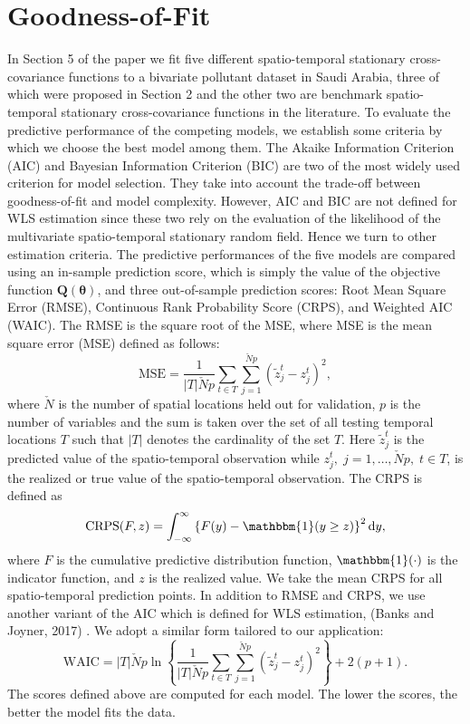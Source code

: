 \documentclass[12pt]{article}
\newcommand{\0}{\mathbf{0}}
\begin{document}
\section{Goodness-of-Fit}
In Section 5 of the paper we fit five different spatio-temporal stationary cross-covariance functions to a bivariate pollutant dataset in Saudi Arabia, three of which were proposed in Section 2 and the other two are benchmark spatio-temporal stationary cross-covariance functions in the literature. To evaluate the predictive performance of the competing models, we establish some criteria by which we choose the best model among them. The Akaike Information Criterion (AIC) and Bayesian Information Criterion (BIC) are two of the most widely used criterion for model selection. They take into account the trade-off between goodness-of-fit and model complexity. However, AIC and BIC are not defined for WLS estimation since these two rely on the evaluation of the likelihood of the multivariate spatio-temporal stationary random field. Hence we turn to other estimation criteria. The predictive performances of the five models are compared using an in-sample prediction score, which is simply the value of the objective function $\mathbf{Q}(\boldsymbol{\theta})$, and three out-of-sample prediction scores: Root Mean Square Error (RMSE), Continuous Rank Probability Score (CRPS), and Weighted AIC (WAIC).  The RMSE is the square root of the MSE, where MSE is the mean square error (MSE) defined as follows:
\begin{equation*}
\text{MSE}=\frac{1}{|T|\check{N}p }\sum_{t\in T}\sum_{j=1}^{\check{N}p}\left(\tilde{z}_{j}^{t}-z_{j}^t\right)^2,
\end{equation*}
where $\check{N}$ is the number of spatial locations held out for validation, $p$ is the number of variables and the sum is taken over the set of all testing temporal locations $T$ such that $|T|$ denotes the cardinality of the set $T$. Here $\tilde{z}_{j}^t$ is the predicted value of the spatio-temporal observation while $z_j^t,\;j=1,\ldots,\check{N}p,\; t\in T$, is the realized or true value of the spatio-temporal observation. The CRPS is defined as 
\begin{equation*}
\text{CRPS}(F,z)=\int_{-\infty}^{\infty}\left\{F(y)-\mathbbm{1}(y\geq z)\right\}^2\dd y,
\end{equation*}
where $F$ is the cumulative predictive distribution function, $\mathbbm{1}(\cdot)$ is the indicator function, and $z$ is the realized value. We take the mean CRPS for all spatio-temporal prediction points. In addition to RMSE and CRPS, we use another variant of the AIC which is defined for WLS estimation, (Banks and Joyner, 2017) . We adopt a similar form tailored to our application:
\begin{equation*}
\text{WAIC}=|T|\check{N}p \ln \left\{ \frac{1}{|T|\check{N}p} \sum_{t\in T}\sum_{j=1}^{\check{N}p}\left(\tilde{z}_{j}^{t}-z_{j}^t\right)^2 \right\}+2(p+1).
\end{equation*}
The scores defined above are computed for each model. The lower the scores, the better the model fits the data.
\end{document}
